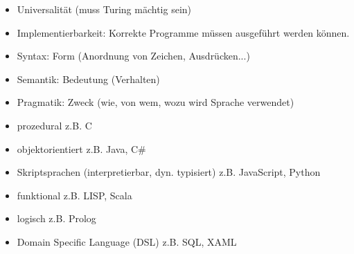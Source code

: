 \begin{itemize}
\item Universalität (muss Turing mächtig sein)
\item Implementierbarkeit: Korrekte Programme müssen ausgeführt werden können.
\item Syntax: Form (Anordnung von Zeichen, Ausdrücken...)
 \item Semantik: Bedeutung (Verhalten)
 \item Pragmatik: Zweck (wie, von wem, wozu wird Sprache verwendet)
\end{itemize}
\begin{itemize}
\item prozedural z.B. C
\item objektorientiert z.B. Java, C\#
\item Skriptsprachen (interpretierbar, dyn. typisiert) z.B. JavaScript, Python
\end{itemize}
\begin{itemize}
\item funktional z.B. LISP, Scala
\item logisch z.B. Prolog
\item Domain Specific Language (DSL) z.B.  SQL, XAML
\end{itemize}


